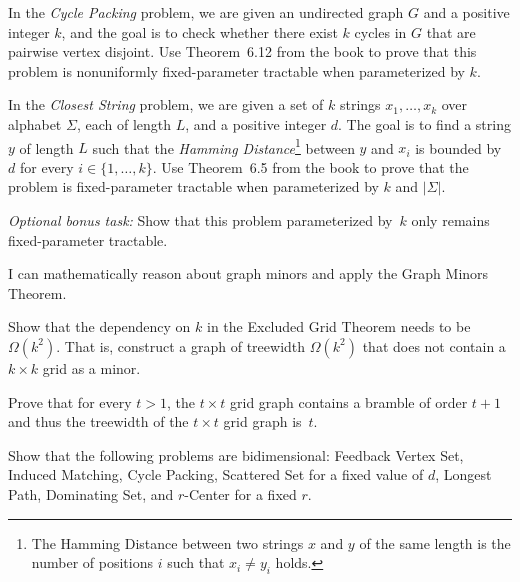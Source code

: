 \documentclass{uebung_cs}
\begin{document}
\begin{exercise}
In the \emph{Cycle Packing} problem, we are given an undirected graph $G$ and a positive integer $k$, and the goal is to check whether there exist $k$ cycles in $G$ that are pairwise vertex disjoint. Use Theorem~6.12 from the book to prove that this problem is nonuniformly fixed-parameter tractable when parameterized by $k$.
\end{exercise}

\begin{exercise}
  In the \emph{Closest String} problem, we are given a set of $k$ strings $x_1,\dots,x_k$ over alphabet $\Sigma$, each of length $L$, and a positive integer $d$. The goal is to find a string $y$ of length $L$ such that the \emph{Hamming Distance}\footnote{The Hamming Distance between two strings $x$ and $y$ of the same length is the number of positions $i$ such that $x_i \neq y_i$ holds.} between $y$ and $x_i$ is bounded by $d$ for every $i\in \{1,\dots,k\}$. Use Theorem~6.5 from the book to prove that the problem is fixed-parameter tractable when parameterized by $k$ and $|\Sigma|$.
  
  \noindent\emph{Optional bonus task:} Show that this problem parameterized by~$k$ only remains fixed-parameter tractable.
  \end{exercise}
  

  \begin{skill}
    I can mathematically reason about graph minors and apply the Graph Minors Theorem.
  \end{skill}

  \begin{exercise}
    Show that the dependency on $k$ in the Excluded Grid Theorem needs to be $\Omega(k^2)$. That is, construct a graph of treewidth $\Omega(k^2)$ that does not contain a $k \times k$ grid as a minor.
  \end{exercise}

  \begin{exercise}
    Prove that for every $t > 1$, the $t\times t$ grid graph contains a bramble of order $t + 1$ and thus the treewidth of the $t\times t$ grid graph is~$t$.
  \end{exercise}

  \begin{exercise}[Bidimensionality]
    Show that the following problems are bidimensional: Feedback Vertex Set, Induced Matching, Cycle Packing, Scattered Set for a fixed value of $d$, Longest Path, Dominating Set, and $r$-Center for a fixed $r$.
    \end{exercise}
\end{document}
